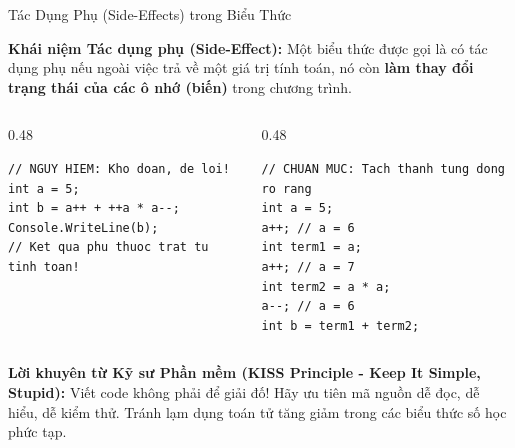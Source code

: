\documentclass[aspectratio=169, 10pt]{beamer}
\begin{document}
\begin{frame}[fragile]{Tác Dụng Phụ (Side-Effects) trong Biểu Thức}
  \begin{block}{\textbf{Khái niệm Tác dụng phụ (Side-Effect):}}
    Một biểu thức được gọi là có tác dụng phụ nếu ngoài việc trả về một giá trị tính toán, nó còn \textbf{làm thay đổi trạng thái của các ô nhớ (biến)} trong chương trình.
  \end{block}

  \begin{columns}[T]
    \begin{column}{0.48\textwidth}
      \begin{tcolorbox}[colback=AlertRed!10,colframe=AlertRed,title=\textbf{Mã nguồn có Side-Effect phức tạp (Tránh)},fonttitle=\small\bfseries]
\begin{lstlisting}[numbers=none]
// NGUY HIEM: Kho doan, de loi!
int a = 5;
int b = a++ + ++a * a--;
Console.WriteLine(b); 
// Ket qua phu thuoc trat tu tinh toan!
\end{lstlisting}
      \end{tcolorbox}
    \end{column}

    \begin{column}{0.48\textwidth}
      \begin{tcolorbox}[colback=UniGreen!10,colframe=UniGreen,title=\textbf{Mã nguồn Tường minh \& Trong sáng (Khuyên dùng)},fonttitle=\small\bfseries]
\begin{lstlisting}[numbers=none]
// CHUAN MUC: Tach thanh tung dong ro rang
int a = 5;
a++; // a = 6
int term1 = a;
a++; // a = 7
int term2 = a * a;
a--; // a = 6
int b = term1 + term2;
\end{lstlisting}
      \end{tcolorbox}
    \end{column}
  \end{columns}

  \vspace{2mm}
  \begin{exampleblock}{\textbf{Lời khuyên từ Kỹ sư Phần mềm (KISS Principle - Keep It Simple, Stupid):}}
    Viết code không phải để giải đố! Hãy ưu tiên mã nguồn dễ đọc, dễ hiểu, dễ kiểm thử. Tránh lạm dụng toán tử tăng giảm trong các biểu thức số học phức tạp.
  \end{exampleblock}
\end{frame}
\end{document}
